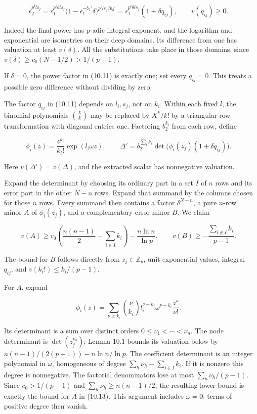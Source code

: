 \documentclass[
  11pt,
  a4paper,
]{article}
\begin{document}
\[
\epsilon_2^{p^t l s_j}
=\epsilon_1^{p^t\theta l s_j}
\bigl(1-\epsilon_1^{-b_1'}\delta\bigr)^{p^t l s_j/b_2'}
=\epsilon_1^{p^t\theta l s_j}(1+\delta q_{ij}),
\qquad v(q_{ij})\ge0.
\tag{10.11}
\]

Indeed the final power has p-adic integral exponent, and the logarithm
and exponential are isometries on their deep domains. Its difference
from one has valuation at least \(v(\delta)\). All the substitutions
take place in those domains, since \(v(\delta)\ge c_0(N-1/2)>1/(p-1)\).

If \(\delta=0\), the power factor in (10.11) is exactly one; set every
\(q_{ij}=0\). This treats a possible zero difference without dividing by
zero.

The factor \(q_{ij}\) in (10.11) depends on \(l_i,s_j\), not on \(k_i\).
Within each fixed \(l\), the binomial polynomials \(\binom Xk\) may be
replaced by \(X^k/k!\) by a triangular row transformation with diagonal
entries one. Factoring \(b_2^{k_i}\) from each row, define

\[
\phi_i(z)=\frac{z^{k_i}}{k_i!}\exp(l_i\omega z),
\qquad
\Delta'=b_2^{\sum_i k_i}
\det\bigl(\phi_i(z_j)(1+\delta q_{ij})\bigr).
\tag{10.12}
\]

Here \(v(\Delta')=v(\Delta)\), and the extracted scalar has nonnegative
valuation.

Expand the determinant by choosing its ordinary part in a set \(I\) of
\(n\) rows and its error part in the other \(N-n\) rows. Expand that
summand by the columns chosen for those \(n\) rows. Every summand then
contains a factor \(\delta^{N-n}\), a pure \(n\)-row minor \(A\) of
\(\phi_i(z_j)\), and a complementary error minor \(B\). We claim

\[
v(A)\ge c_0\left(\frac{n(n-1)}2-\sum_{i\in I}k_i\right)
-\frac{n\ln n}{\ln p},
\qquad
v(B)\ge-\frac{\sum_{i\notin I}k_i}{p-1}.
\tag{10.13}
\]

The bound for \(B\) follows directly from \(z_j\in\mathbb Z_p\), unit
exponential values, integral \(q_{ij}\), and \(v(k_i!)\le k_i/(p-1)\).

For \(A\), expand

\[
\phi_i(z)=\sum_{\nu\ge k_i}\binom\nu{k_i}
l_i^{\nu-k_i}\omega^{\nu-k_i}\frac{z^\nu}{\nu!}.
\]

Its determinant is a sum over distinct orders
\(0\le\nu_1<\cdots<\nu_n\). The node determinant is
\(\det(z_j^{\nu_h})\); Lemma 10.1 bounds its valuation below by
\(n(n-1)/(2(p-1))-n\ln n/\ln p\). The coefficient determinant is an
integer polynomial in \(\omega\), homogeneous of degree
\(\sum_h\nu_h-\sum_{i\in I}k_i\). If it is nonzero this degree is
nonnegative. The factorial denominators lose at most
\(\sum_h\nu_h/(p-1)\). Since \(c_0>1/(p-1)\) and
\(\sum_h\nu_h\ge n(n-1)/2\), the resulting lower bound is exactly the
bound for \(A\) in (10.13). This argument includes \(\omega=0\); terms
of positive degree then vanish.
\end{document}
